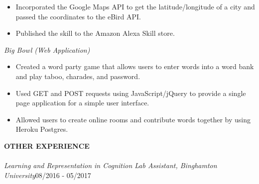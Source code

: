 \documentclass[10.5pt]{res}
\newcommand{\sectionSpace}{\vspace{-3pt}}
\newcommand{\itemSpace}{\vspace{-8pt}}
\begin{document}
\begin{resume}
\begin{itemize}
 	\item Incorporated the Google Maps API to get the latitude/longitude of a city and passed the coordinates to the eBird API.
	\item Published the skill to the Amazon Alexa Skill store.
	\end{itemize}
	\itemSpace
{\it Big Bowl (Web Application)}\\ [-11pt]  
	\begin{itemize} \itemsep -1pt %
	\item Created a word party game that allows users to enter words into a word bank and play taboo, charades, and password.
 	\item Used GET and POST requests using JavaScript/jQuery to provide a single page application for a simple user interface.
	\item Allowed users to create online rooms and contribute words together by using Heroku Postgres.
	\end{itemize}
	\sectionSpace

\textbf{OTHER EXPERIENCE} \\ [-10.5pt]
\noindent\makebox[\linewidth]{\rule{\textwidth}{0.4pt}}\\
{\it Learning and Representation in Cognition Lab Assistant, Binghamton University}\hfill 08/2016 - 05/2017 \\ [-11pt]
\end{resume}
\end{document}
